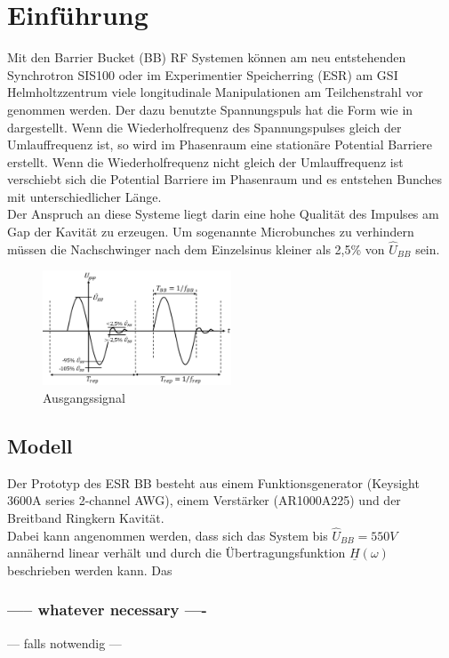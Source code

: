 \documentclass[../Report.tex]{subfiles}
\begin{document}
\chapter{Einführung}
\label{chap:einfuehrung}
Mit den Barrier Bucket (BB) RF Systemen können am neu entstehenden Synchrotron SIS100 oder im Experimentier Speicherring (ESR) am GSI Helmholtzzentrum viele longitudinale Manipulationen am Teilchenstrahl vor genommen werden. Der dazu benutzte Spannungspuls hat die Form wie in  dargestellt. Wenn die Wiederholfrequenz des Spannungspulses gleich der Umlauffrequenz ist, so wird im Phasenraum eine stationäre Potential Barriere erstellt. Wenn die Wiederholfrequenz nicht gleich der Umlauffrequenz ist verschiebt sich die Potential Barriere im Phasenraum und es entstehen Bunches mit unterschiedlicher Länge. \\ Der Anspruch an diese Systeme liegt darin eine hohe Qualität des Impulses am Gap der Kavität zu erzeugen. Um sogenannte Microbunches zu verhindern müssen die Nachschwinger nach dem Einzelsinus kleiner als 2,5\% von $\hat{U}_{BB}$ sein. 
\begin{figure}[h!]
  \centering
    \includegraphics[width=0.5\textwidth]{images/eps/BB_req.pdf}
  \caption{Ausgangssignal}
  \label{fig:BB_req}
\end{figure}
\section[Modell und Konvention]{Modell}
\label{sec:einf.modell_BB}
Der Prototyp des ESR BB besteht aus einem Funktionsgenerator (Keysight 3600A series 2-channel AWG), einem Verstärker (AR1000A225) und der Breitband Ringkern Kavität.\\Dabei kann angenommen werden, dass sich das System bis $\hat{U}_{BB} = 550V$ annähernd linear verhält und durch die Übertragungsfunktion $\underline{H}(\omega)$ beschrieben werden kann. Das
\subsection{ ----- whatever necessary ----}
\label{subsec:einf.modell_BB.name}
--- falls notwendig ---
\end{document}
